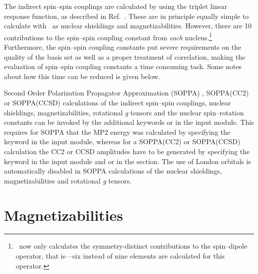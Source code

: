 The indirect spin--spin couplings are calculated by using the triplet linear
response function, as described in
Ref.~\cite{ovhapjhjajsbpthjcp96}.
These are in principle equally simple to calculate with \dalton\ as
nuclear shieldings and magnetizabilities. However, there are 10
contributions to the spin--spin coupling constant from {\em each}
nucleus.\footnote{\dalton\ now only calculates the symmetry-distinct
  contributions to the spin--dipole operator, that is---six instead of
  nine elements are calculated for this operator.} Furthermore, the
spin--spin coupling constants put severe
requirements on the quality of the basis set as well as a proper
treatment of correlation, making the evaluation of spin--spin coupling
constants a time consuming task. Some notes about how this time
can be reduced is given below.

Second Order Polarization Propagator Approximation (SOPPA) 
\cite{esnpjjodjcp73,jopjdycpr2,mjpekdtehjajjojcp,spascpl260,tejospastcan100},
SOPPA(CC2)  \cite{spas097} or SOPPA(CCSD)
 \cite{soppaccsd,spascpl260,tejospastcan100}
calculations of the indirect spin--spin couplings, nuclear shieldings,
magnetizabilities, rotational {\em g} tensors and the nuclear
spin--rotation constants can be invoked by the additional keywords
 or  in the  input module.
This requires for SOPPA that the MP2 energy was calculated by
specifying the keyword  in the  input
module, whereas for a SOPPA(CC2) or SOPPA(CCSD) calculation the CC2 or
CCSD amplitudes have to be generated by specifying the keyword 
in the  input module and  or
 in the  section. The use of London
orbitals is automatically disabled in SOPPA calculations of the nuclear
shieldings, magnetizabilities and rotational {\em g} tensors.

\section{Magnetizabilities}\label{sec:magnetizability}

